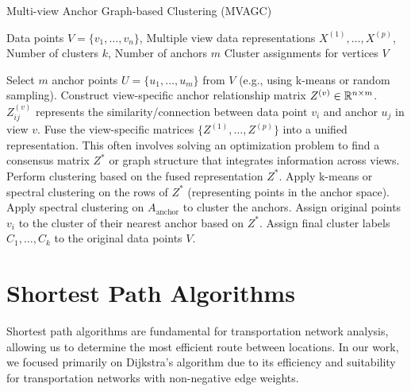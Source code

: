 \begin{algorithm}[H]
\caption{Multi-view Anchor Graph-based Clustering (MVAGC)}
\label{alg:mvagc}
\begin{algorithmic}[1]
\Require Data points $V = \{v_1, \dots, v_n\}$, Multiple view data representations $X^{(1)}, \dots, X^{(p)}$, Number of clusters $k$, Number of anchors $m$
\Ensure Cluster assignments for vertices $V$

\State Select $m$ anchor points $U = \{u_1, \dots, u_m\}$ from $V$ (e.g., using k-means or random sampling).
    \State Construct view-specific anchor relationship matrix $Z^{(v)} \in \mathbb{R}^{n \times m}$. $Z_{ij}^{(v)}$ represents the similarity/connection between data point $v_i$ and anchor $u_j$ in view $v$.
\EndFor
\State Fuse the view-specific matrices $\{Z^{(1)}, \dots, Z^{(p)}\}$ into a unified representation. This often involves solving an optimization problem to find a consensus matrix $Z^*$ or graph structure that integrates information across views. 
\State Perform clustering based on the fused representation $Z^*$.
        \State Apply k-means or spectral clustering on the rows of $Z^*$ (representing points in the anchor space).
        \State Apply spectral clustering on $A_{\text{anchor}}$ to cluster the anchors.
        \State Assign original points $v_i$ to the cluster of their nearest anchor based on $Z^*$.
    \EndIf
\State Assign final cluster labels $C_1, \dots, C_k$ to the original data points $V$.

\end{algorithmic}
\end{algorithm}

\section{Shortest Path Algorithms}
\label{se:ShortestPathAlgorithms}

Shortest path algorithms are fundamental for transportation network analysis, allowing us to determine the most efficient route between locations. In our work, we focused primarily on Dijkstra's algorithm due to its efficiency and suitability for transportation networks with non-negative edge weights.

